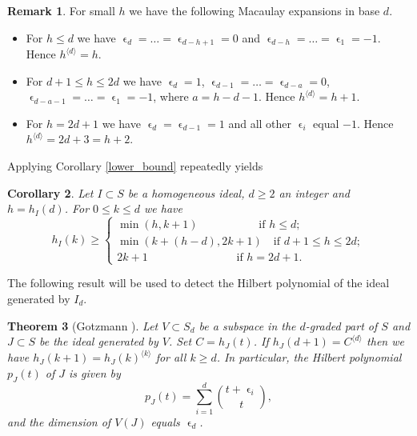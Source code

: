 \documentclass[a4paper,11pt,english,german]{amsart}
\DeclareMathOperator{\eps}{\epsilon}
\newtheorem{thm}{Theorem}[section]
\newtheorem{cor}[thm]{Corollary}
\theoremstyle{definition}
\newtheorem{remark}[thm]{Remark}
\begin{document}
\begin{remark}\label{macaulay_examples}
For small $h$ we have the following Macaulay expansions in base $d$.
\begin{itemize}
	\item For $h\leqslant d$ we have $\eps_d=\dots =\eps_{d-h+1}=0$ and $\eps_{d-h}=\dots=\eps_1=-1$. Hence $h^{\langle d\rangle}=h$.
	\item For $d+1\leqslant h \leqslant 2d$ we have $\eps_d=1$, $\eps_{d-1}=\dots =\eps_{d-a}=0$, $\eps_{d-a-1}=\dots = \eps_1=-1$, where $a=h-d-1$. Hence $h^{\langle d \rangle}=h+1$.
	\item For $h=2d+1$ we have $\eps_d=\eps_{d-1}=1$ and all other $\eps_i$ equal $-1$. Hence $h^{\langle d\rangle}=2d+3=h+2$.
\end{itemize}	
\end{remark}

Applying Corollary \ref{lower_bound} repeatedly yields
\begin{cor}\label{corollary_example}
Let $I\subset S$ be a homogeneous ideal, $d\geqslant 2$ an integer and $h=h_I(d)$. For $0\leqslant k \leqslant d$ we have 
\begin{equation*}
	h_I(k)\geqslant 
	\begin{cases}
	\min(h,k+1) \hspace{65pt}\text{if } h \leqslant d;\\
	\min(k+(h-d),2k+1) \hspace{12pt}\text{if } d+1 \leqslant h \leqslant 2d;\\
	2k+1	\hspace{95pt}\text{if } h=2d+1.
	\end{cases}
\end{equation*}	
\end{cor}

The following result will be used to detect the Hilbert polynomial of the ideal generated by $I_d$.

\begin{thm}[Gotzmann \cite{gotzmann1978bedingung}] \label{gotzmann}
	Let $V \subset S_d$ be a subspace in the $d$-graded part of $S$ and $J\subset S$ be the ideal generated by $V$. Set $C=h_J(t)$. If $h_J(d+1)=C^{\langle d \rangle}$ then we have $h_J(k+1)=h_J(k)^{\langle k\rangle}$ for all $k \geqslant d$. In particular, the Hilbert polynomial $p_J(t)$ of $J$ is given by
	\begin{equation*}
		p_J(t)=\sum\limits_{i=1}^{d}\binom{t+ \eps_i}{t},
	\end{equation*} 
	and the dimension of $V(J)$ equals $\eps_d$.
\end{thm}
\end{document}
